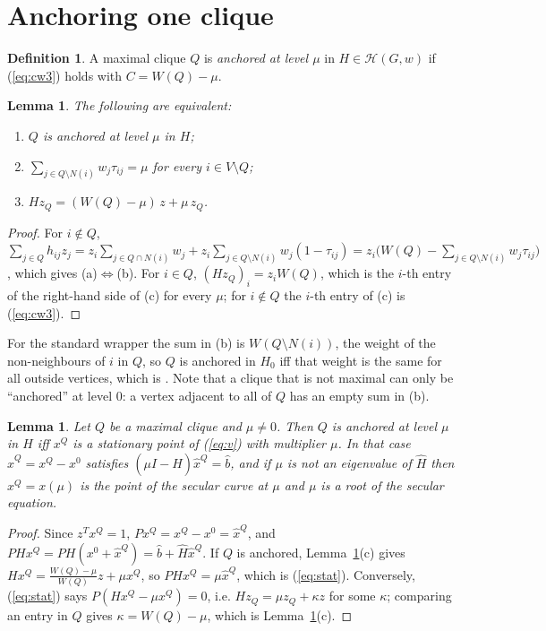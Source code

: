 \documentclass[11pt]{article}
\newtheorem{lem}[thm]{Lemma}
\theoremstyle{definition}
\newtheorem{defn}[thm]{Definition}
\theoremstyle{remark}
\newcommand{\Hc}{\mathcal{H}}
\newcommand{\hH}{\hat{H}}
\newcommand{\hb}{\hat{b}}
\newcommand{\hx}{\hat{x}}
\begin{document}
\section{Anchoring one clique}
\label{sec:one}

\begin{defn}
A maximal clique $Q$ is {\em anchored at level $\mu$} in $H\in\Hc(G,w)$ if
(\ref{eq:cw3}) holds with $C=W(Q)-\mu$.
\end{defn}

\begin{lem}
\label{lem:tau}
The following are equivalent:
\begin{enumerate}
\item[(a)] $Q$ is anchored at level $\mu$ in $H$;
\item[(b)] $\sum_{j\in Q\setminus N(i)} w_j\tau_{ij}=\mu$ for every
$i\in V\setminus Q$;
\item[(c)] $Hz_Q=(W(Q)-\mu)\,z+\mu\,z_Q$.
\end{enumerate}
\end{lem}
\begin{proof}
For $i\notin Q$,
$\sum_{j\in Q}h_{ij}z_j=z_i\sum_{j\in Q\cap N(i)}w_j
+z_i\sum_{j\in Q\setminus N(i)}w_j(1-\tau_{ij})
=z_i\bigl(W(Q)-\sum_{j\in Q\setminus N(i)}w_j\tau_{ij}\bigr)$,
which gives (a)$\iff$(b). For $i\in Q$, $(Hz_Q)_i=z_iW(Q)$, which is the
$i$-th entry of the right-hand side of (c) for every $\mu$; for $i\notin Q$
the $i$-th entry of (c) is (\ref{eq:cw3}).
\end{proof}

For the standard wrapper the sum in (b) is $W(Q\setminus N(i))$, the weight
of the non-neighbours of $i$ in $Q$, so $Q$ is anchored in $H_0$ iff that
weight is the same for all outside vertices, which is \cite[Corollary~1]{CW}.
Note that a clique that is not maximal can only be ``anchored'' at level
$0$: a vertex adjacent to all of $Q$ has an empty sum in (b).

\begin{lem}
\label{lem:onsecular}
Let $Q$ be a maximal clique and $\mu\neq0$. Then $Q$ is anchored at level
$\mu$ in $H$ iff $x^Q$ is a stationary point of (\ref{eq:v}) with
multiplier $\mu$. In that case $\hx^Q=x^Q-x^0$ satisfies
$(\mu I-\hH)\hx^Q=\hb$, and if $\mu$ is not an eigenvalue of $\hH$ then
$x^Q=x(\mu)$ is the point of the secular curve at $\mu$ and $\mu$ is a
root of the secular equation.
\end{lem}
\begin{proof}
Since $z^Tx^Q=1$, $Px^Q=x^Q-x^0=\hx^Q$, and $PHx^Q=PH(x^0+\hx^Q)=
\hb+\hH\hx^Q$. If $Q$ is anchored, Lemma~\ref{lem:tau}(c) gives
$Hx^Q=\frac{W(Q)-\mu}{W(Q)}z+\mu x^Q$, so $PHx^Q=\mu\hx^Q$, which is
(\ref{eq:stat}). Conversely, (\ref{eq:stat}) says $P(Hx^Q-\mu x^Q)=0$, i.e.
$Hz_Q=\mu z_Q+\kappa z$ for some $\kappa$; comparing an entry in $Q$ gives
$\kappa=W(Q)-\mu$, which is Lemma~\ref{lem:tau}(c).
\end{proof}
\end{document}

